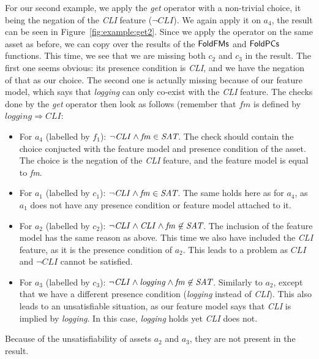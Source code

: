 \begin{example}
For our second example, we apply the \emph{get} operator with a non-trivial choice, it being
the negation of the \emph{CLI} feature (\(\neg\mathit{CLI}\)). We again apply it on $a_4$, the
result can be seen in Figure~\ref{fig:example:get2}. Since we apply the operator on the same
asset as before, we can copy over the results of the \({\sf FoldFMs}\) and \({\sf FoldPCs}\)
functions. This time, we see that we are missing both $c_2$ and $c_3$ in the result. The first
one seems obvious: its presence condition is \emph{CLI}, and we have the negation of that as our
choice. The second one is actually missing because of our feature model, which says that
\emph{logging} can only co-exist with the \emph{CLI} feature. The checks done by the \emph{get}
operator then look as follows (remember that \(\mathit{fm}\) is defined by
\(\mathit{logging} \Rightarrow \mathit{CLI}\):

\begin{itemize}
  \item For $a_4$ (labelled by $f_1$): \(\neg\mathit{CLI} \land \mathit{fm}\in\textit{SAT}\).
        The check should contain the choice conjucted with the feature model and presence condition
        of the asset. The choice is the negation of the \emph{CLI} feature, and the feature model
        is equal to \emph{fm}.
  \item For $a_1$ (labelled by $c_1$): \(\neg\mathit{CLI} \land \mathit{fm}\in\textit{SAT}\). The same holds
        here as for $a_4$,
        as $a_1$ does not have any presence condition or feature model attached to it.
  \item For $a_2$ (labelled by $c_2$): \(\neg\mathit{CLI} \land \mathit{CLI} \land \mathit{fm} \not\in \textit{SAT}\).
        The inclusion of the feature model has the same reason as above. This time we also have included the
        \emph{CLI} feature, as it is the presence condition of $a_2$. This leads to a problem as \(\mathit{CLI}\) and \(\neg\mathit{CLI}\) cannot be satisfied.
  \item For $a_3$ (labelled by $c_3$): \(\neg\mathit{CLI} \land \mathit{logging} \land \mathit{fm} \not\in \textit{SAT}\). Similarly
        to $a_2$, except that we have a different presence condition (\emph{logging} instead of
        \emph{CLI}). This also leads to an unsatisfiable situation, as our feature model says that
        \emph{CLI} is implied by \emph{logging}. In this case, \emph{logging} holds yet \emph{CLI} does not.
\end{itemize}
Because of the unsatisfiability of assets $a_2$ and $a_3$, they are not present in the result.
\end{example}

